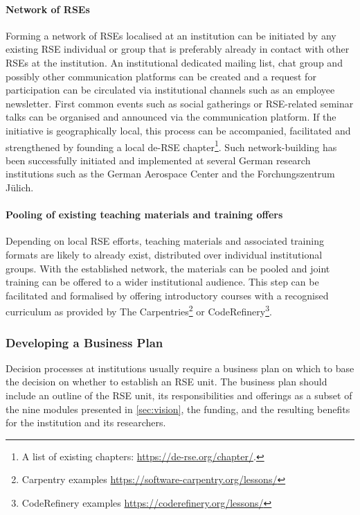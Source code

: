 \documentclass[a4paper]{article}
\begin{document}
\paragraph{Network of RSEs}
Forming a network of RSEs localised at an institution can be initiated by any existing RSE individual or group that is preferably already in contact with other RSEs at the institution.
An institutional dedicated mailing list, chat group and possibly other communication platforms can be created and a request for participation can be circulated via institutional channels such as an employee newsletter.
First common events such as social gatherings or RSE-related seminar talks can be organised and announced via the communication platform.
If the initiative is geographically local, this process can be accompanied, facilitated and strengthened by founding a local de-RSE chapter\footnote{A list of existing chapters: \url{https://de-rse.org/chapter/}.}.
Such network-building has been successfully initiated and implemented at several German research institutions such as the German Aerospace Center and the Forchungszentrum Jülich.

\paragraph{Pooling of existing teaching materials and training offers}
Depending on local RSE efforts, teaching materials and associated training formats are likely to already exist,
distributed over individual institutional groups.
With the established network, the materials can be pooled and joint training can be offered to a wider institutional audience.
This step can be facilitated and formalised by offering introductory courses with a recognised curriculum as provided by The Carpentries\footnote{Carpentry examples \url{https://software-carpentry.org/lessons/}}
or CodeRefinery\footnote{CodeRefinery examples \url{https://coderefinery.org/lessons/}}.

\subsubsection{Developing a Business Plan}
Decision processes at institutions usually require a business plan on which to base the decision on whether to establish an RSE unit.
The business plan should include an outline of the RSE unit, its responsibilities and offerings as a subset of the nine modules presented in \autoref{sec:vision}, the funding, and the resulting benefits for the institution and its researchers.
\end{document}

